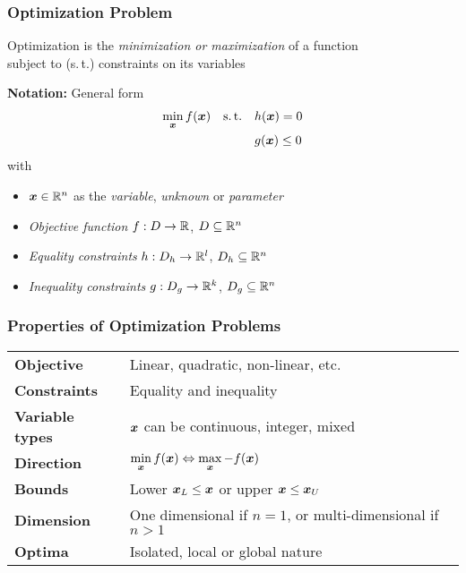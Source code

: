 \documentclass[%
  final,
  11pt, 
  show notes, %
  t, %
  fleqn, %
]{beamer}
\begin{document}
\begin{frame}[fragile]
  \frametitle{Optimization Problem}
Optimization is the \emph{minimization or maximization} of a function \\
subject to (s.\,t.) constraints on its variables

\vspace*{0.4cm}
\textbf{Notation:} General form
\begin{align*}
\min\limits_{\bm{x}} f(\bm{x}) \quad\text{s.\,t.}\quad & h(\bm{x}) = 0 \\
 & g(\bm{x}) \leq 0
\end{align*}
with
\begin{itemize}
\item $\bm{x} \in\mathbb{R}^n$ as the \emph{variable}, \emph{unknown} or \emph{parameter}
\item \emph{Objective function} $f : D \rightarrow \mathbb{R}$, $D \subseteq \mathbb{R}^n$
\item \emph{Equality constraints} $h : D_h \rightarrow \mathbb{R}^l$, $D_h \subseteq \mathbb{R}^n$
\item \emph{Inequality constraints} $g : D_g \rightarrow \mathbb{R}^k$, $D_g \subseteq \mathbb{R}^n$
\end{itemize}
\end{frame}

\begin{frame}[fragile]
  \frametitle{Properties of Optimization Problems}
{\renewcommand{\arraystretch}{1.8}%
\begin{tabular}{ll}
\textbf{Objective} & Linear, quadratic, non-linear, etc. \\
\textbf{Constraints} & Equality and inequality \\
\textbf{Variable types} & $\bm{x}$ can be continuous, integer, mixed \\
\textbf{Direction} & $\min\limits_{\bm{x}} f(\bm{x}) \Leftrightarrow \max\limits_{\bm{x}} -f(\bm{x})$ \\
\textbf{Bounds} & Lower $\bm{x}_L \leq \bm{x}$ or upper $\bm{x} \leq \bm{x}_U$ \\
\textbf{Dimension} & One dimensional if $n = 1$, or multi-dimensional if $n > 1$ \\
\textbf{Optima} & Isolated, local or global nature \\
\end{tabular}
}
\end{frame}
\end{document}
